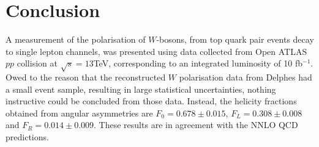 \documentclass[12pt,a4paper]{article}
\numberwithin{equation}{section}
\begin{document}
\cleardoublepage
\section{Conclusion}
A measurement of the polarisation of $W$-bosons, from top quark pair events
decay to single lepton channels, was presented using data collected from Open
ATLAS $pp$ collision at $\sqrt s = 13$TeV, corresponding to an integrated
luminosity of 10 fb$^{-1}$. Owed to the reason that the reconstructed $W$
polarisation data from Delphes had a small event sample, resulting in large
statistical uncertainties, nothing instructive could be concluded from those
data. Instead, the helicity fractions obtained from angular asymmetries are
$F_0=0.678 \pm 0.015$, $F_L=0.308 \pm 0.008$ and $F_R=0.014 \pm 0.009$. These
results are in agreement with the NNLO QCD predictions.


\printbibliography
\end{document}
